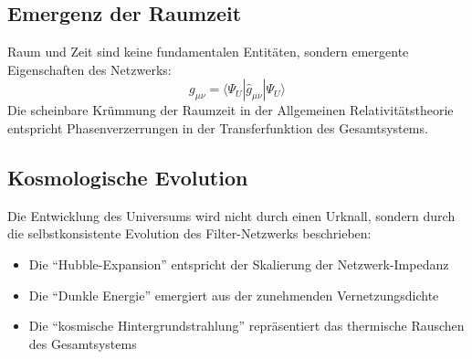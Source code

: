 \subsection{Emergenz der Raumzeit}

Raum und Zeit sind keine fundamentalen Entitäten, sondern emergente Eigenschaften des Netzwerks:
\[
g_{\mu\nu} = \langle \Psi_U | \hat{g}_{\mu\nu} | \Psi_U \rangle
\]
Die scheinbare Krümmung der Raumzeit in der Allgemeinen Relativitätstheorie entspricht Phasenverzerrungen in der Transferfunktion des Gesamtsystems.

\subsection{Kosmologische Evolution}

Die Entwicklung des Universums wird nicht durch einen Urknall, sondern durch die selbstkonsistente Evolution des Filter-Netzwerks beschrieben:
\begin{itemize}
\item Die \enquote{Hubble-Expansion} entspricht der Skalierung der Netzwerk-Impedanz
\item Die \enquote{Dunkle Energie} emergiert aus der zunehmenden Vernetzungsdichte
\item Die \enquote{kosmische Hintergrundstrahlung} repräsentiert das thermische Rauschen des Gesamtsystems
\end{itemize}
